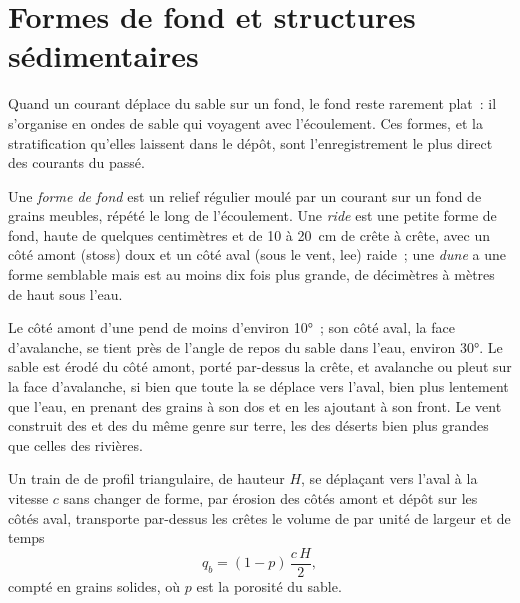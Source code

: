 \section{Formes de fond et structures sédimentaires}\label{sec:b1:clastic-sediments:bedforms}

Quand un courant déplace du sable sur un fond, le fond reste rarement plat~: il s'organise
en ondes de sable qui voyagent avec l'écoulement. Ces formes, et la
stratification qu'elles laissent dans le dépôt, sont l'enregistrement le plus direct des
courants du passé.

\begin{definition}\label{def:b1:clastic-sediments:bedform}
Une \emph{forme de fond} est un relief régulier moulé par un courant sur un
fond de grains meubles, répété le long de l'écoulement. Une \emph{ride} est une
petite forme de fond, haute de quelques centimètres et de 10 à \qty{20}{cm} de crête à
crête, avec un côté amont (stoss) doux et un côté aval (sous le vent, lee) raide~; une
\emph{dune} a une forme semblable mais est au moins dix fois plus grande,
de décimètres à mètres de haut sous l'eau.
\end{definition}

Le côté amont d'une  pend de moins d'environ \ang{10}~; son côté aval,
la face d'avalanche, se tient près de l'angle de repos du sable dans l'eau, environ
\ang{30}. Le sable est érodé du côté amont, porté par-dessus la crête, et
avalanche ou pleut sur la face d'avalanche, si bien que toute la  se déplace
vers l'aval, bien plus lentement que l'eau, en prenant des grains à son dos et en
les ajoutant à son front. Le vent construit des  et des  du même genre sur
terre, les  des déserts bien plus grandes que celles des rivières.

\begin{proposition}\label{prop:b1:clastic-sediments:migration}
Un train de  de profil triangulaire, de hauteur $H$, se déplaçant vers l'aval à
la vitesse $c$ sans changer de forme, par érosion des côtés amont et
dépôt sur les côtés aval, transporte par-dessus les crêtes le volume de  par
unité de largeur et de temps
\[
  q_b = (1 - p)\,\frac{c\,H}{2},
\]
compté en grains solides, où $p$ est la porosité du sable.
\end{proposition}

